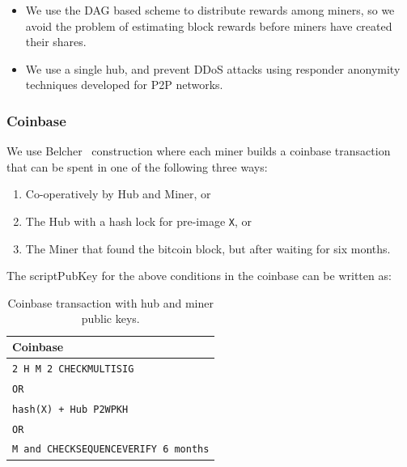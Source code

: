 \documentclass{article}
\begin{document}
\begin{itemize}
\item We use the DAG based scheme to distribute rewards among miners,
  so we avoid the problem of estimating block rewards before miners
  have created their shares.
\item We use a single hub, and prevent DDoS attacks using responder
  anonymity~\cite{responder-anonymity:file-sharing} techniques
  developed for P2P networks.
\end{itemize}



\subsubsection{Coinbase}

We use Belcher~\cite{channels-for-rewards} construction where each
miner builds a coinbase transaction that can be spent in one of the
following three ways:

\begin{enumerate}
\item Co-operatively by Hub and Miner, or
\item The Hub with a hash lock for pre-image \verb|X|, or
\item The Miner that found the bitcoin block, but after waiting
  for six months.
\end{enumerate}

The scriptPubKey for the above conditions in the coinbase can be
written as:

\begin{table}
  \centering
  \begin{tabular}{ l }
    \bfseries Coinbase \\
    \midrule
    \verb|2 H M 2 CHECKMULTISIG| \\
    \verb|OR| \\
    \verb|hash(X) + Hub P2WPKH| \\
    \verb|OR| \\
    \verb|M and CHECKSEQUENCEVERIFY 6 months| \\ 
    \midrule
  \end{tabular}
  \caption{Coinbase transaction with hub and miner public keys.}\label{table:coinbase}
\end{table}
\end{document}
